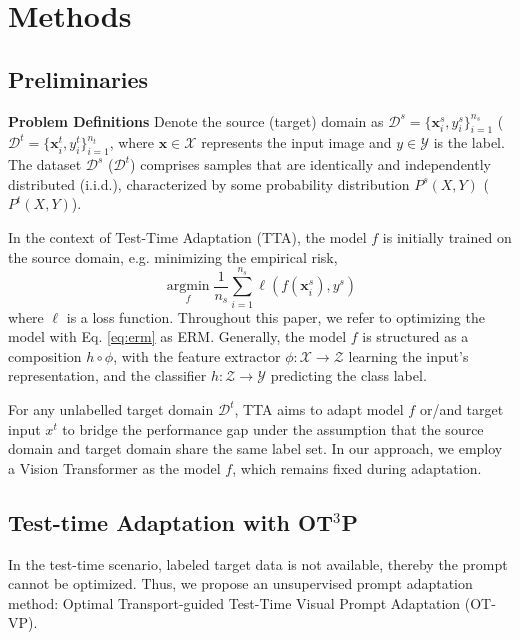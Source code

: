 \documentclass[11pt,a4paper]{article}
\begin{document}
\section{Methods}

\subsection{Preliminaries}
\label{problem_setup_preliminaries}
\textbf{Problem Definitions} Denote the source (target) domain as $\mathcal{D}^s=\{\mathbf{x}_i^s, y_i^s\}_{i=1}^{n_s}$ ($\mathcal{D}^t=\{\mathbf{x}_i^t, y_i^t\}_{i=1}^{n_t}$, where $\mathbf{x} \in \mathcal{X}$ represents the input image and $y\in \mathcal{Y}$ is the label.
The dataset $\mathcal{D}^s$ ($\mathcal{D}^t$) comprises samples that are identically and independently distributed (i.i.d.), characterized by some probability distribution $P^s(X, Y)$ ($P^t(X, Y)$).

In the context of Test-Time Adaptation (TTA), the model $f$ is initially trained on the source domain, e.g. minimizing the empirical risk, 
\begin{equation}
\label{eq:erm}
    \mathop{\arg \min}\limits_{f} \frac{1}{n_s} \sum_{i=1}^{n_s} \ell(f(\mathbf{x}_i^s), y^s)
\end{equation}
where $\ell$ is a loss function. Throughout this paper, we refer to optimizing the model with Eq. \ref{eq:erm} as ERM. 
Generally, the model $f$ is structured as a composition $h \circ \phi$, with the feature extractor $\phi: \mathcal{X} \rightarrow \mathcal{Z}$ learning the input's representation, and the classifier $h: \mathcal{Z} \rightarrow \mathcal{Y}$ predicting the class label. 

For any unlabelled target domain $\mathcal{D}^t$, TTA aims to adapt model $f$ or/and target input $x^t$ to bridge the performance gap under the assumption that the source domain and target domain share the same label set. In our approach, we employ a Vision Transformer as the model $f$, which remains fixed during adaptation.

\subsection{Test-time Adaptation with OT$^3$P}
\label{ot-vp}
In the test-time scenario, labeled target data is not available, thereby the prompt cannot be optimized. 
Thus, we propose an unsupervised prompt adaptation method: Optimal Transport-guided Test-Time Visual Prompt Adaptation (OT-VP). 
\end{document}
